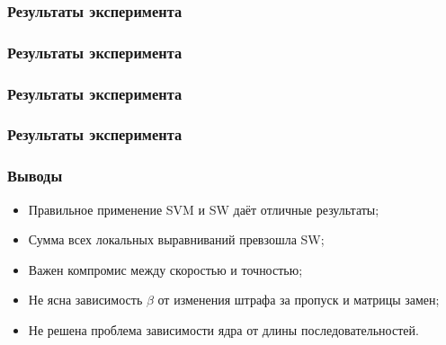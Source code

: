 \documentclass{beamer}
\begin{document}
\begin{frame}
\frametitle{Результаты эксперимента}
    \begin{figure}[h]
    \end{figure}
\end{frame}

\begin{frame}
\frametitle{Результаты эксперимента}
    \begin{figure}[h]
    \end{figure}
\end{frame}

\begin{frame}
\frametitle{Результаты эксперимента}
    \begin{figure}[h]
    \end{figure}
\end{frame}

\begin{frame}
\frametitle{Результаты эксперимента}
    \begin{figure}[h]
    \end{figure}
\end{frame}

\begin{frame}
\frametitle{Выводы}
\begin{itemize}
    \item Правильное применение SVM и SW даёт отличные результаты;
    \item Сумма всех локальных выравниваний превзошла SW;
    \item Важен компромис между скоростью и точностью;
    \item Не ясна зависимость $\beta$ от изменения
        штрафа за пропуск и матрицы замен;
    \item Не решена проблема зависимости ядра от длины последовательностей.
\end{itemize}
\end{frame}
\end{document}
